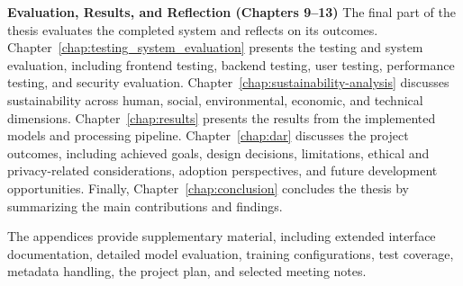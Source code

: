\noindent\textbf{Evaluation, Results, and Reflection (Chapters 9--13)}
The final part of the thesis evaluates the completed system and reflects on its outcomes. Chapter~\ref{chap:testing_system_evaluation} presents the testing and system evaluation, including frontend testing, backend testing, user testing, performance testing, and security evaluation. Chapter~\ref{chap:sustainability-analysis} discusses sustainability across human, social, environmental, economic, and technical dimensions. Chapter~\ref{chap:results} presents the results from the implemented models and processing pipeline. Chapter~\ref{chap:dar} discusses the project outcomes, including achieved goals, design decisions, limitations, ethical and privacy-related considerations, adoption perspectives, and future development opportunities. Finally, Chapter~\ref{chap:conclusion} concludes the thesis by summarizing the main contributions and findings.

The appendices provide supplementary material, including extended interface documentation, detailed model evaluation, training configurations, test coverage, metadata handling, the project plan, and selected meeting notes.